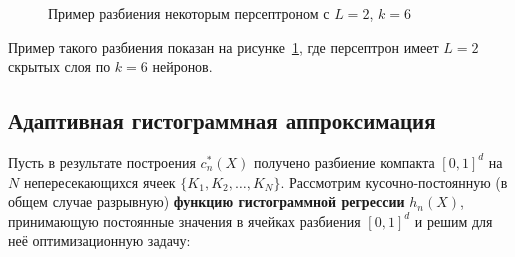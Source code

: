 \begin{figure}[ht]
    \caption{Пример разбиения некоторым персептроном с \(L=2\), \(k=6\)}
    \label{fig:perceptron_partition}
\end{figure}

Пример такого разбиения показан на рисунке~\cref{fig:perceptron_partition}, где персептрон имеет \(L=2\) скрытых слоя по \(k=6\) нейронов.

\subsection{Адаптивная гистограммная аппроксимация}\label{subsec:ch1/histogram_approximation}

Пусть в результате построения \(c_n^*(X)\) получено разбиение компакта \([0, 1]^d\) на \(N\) непересекающихся ячеек \(\{K_1, K_2, \dots, K_N\}\). Рассмотрим кусочно-постоянную (в общем случае разрывную) \textbf{функцию гистограммной регрессии} \(h_n(X)\), принимающую постоянные значения в ячейках разбиения \([0, 1]^d\) и решим для неё оптимизационную задачу:

